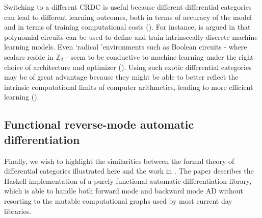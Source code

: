 \documentclass[11pt,a4paper,openright,twoside]{report}
\theoremstyle{plain}
\theoremstyle{definition}
\begin{document}
Switching to a different CRDC is useful because different differential categories can lead to different learning outcomes, both in terms of accuracy of the model and in terms of training computational costs (\cite{wilson2022categories}).
For instance, is argued in \cite{wilson2022categories} that polynomial circuits can be used to define and train intrinsecally discrete machine learning models. Even \lq radical \rq environments such as Boolean circuits - where scalars reside in $\mathbb{Z}_2$ - seem to be conductive to machine learning under the right choice of architecture and optimizer (\cite{wilson2021reverse}). Using such exotic differential categories may be of great advantage because they might be able to better reflect the intrinsic computational limits of computer arithmetics, leading to more efficient learning (\cite{wilson2022categories}). 


\subsection{Functional reverse-mode automatic differentiation}

Finally, we wish to highlight the similarities between the formal theory of differential categories illustrated here and the work in \cite{elliott2018simple}. The paper describes the Haskell implementation of a purely functional automatic differentiation library, which is able to handle both forward mode and backward mode AD without resorting to the mutable computational graphs used by most current day libraries. 
\end{document}
